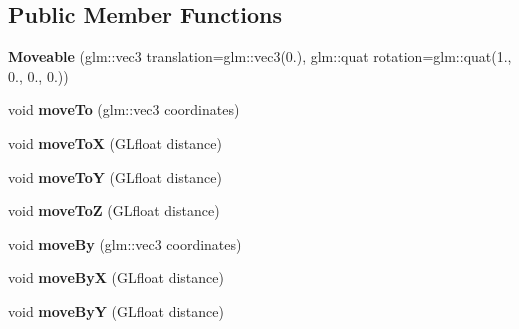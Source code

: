 \subsection*{Public Member Functions}
\begin{DoxyCompactItemize}
\item 
\hypertarget{classfillwave_1_1models_1_1Moveable_a3aeef08f9d141fb567013016bee92313}{}{\bfseries Moveable} (glm\+::vec3 translation=glm\+::vec3(0.), glm\+::quat rotation=glm\+::quat(1., 0., 0., 0.))\label{classfillwave_1_1models_1_1Moveable_a3aeef08f9d141fb567013016bee92313}

\item 
\hypertarget{classfillwave_1_1models_1_1Moveable_a9b6ebdac3c1a9b1bd6d1222c90218386}{}void {\bfseries move\+To} (glm\+::vec3 coordinates)\label{classfillwave_1_1models_1_1Moveable_a9b6ebdac3c1a9b1bd6d1222c90218386}

\item 
\hypertarget{classfillwave_1_1models_1_1Moveable_ac52df2a6d5bdde840392ceb11609712f}{}void {\bfseries move\+To\+X} (G\+Lfloat distance)\label{classfillwave_1_1models_1_1Moveable_ac52df2a6d5bdde840392ceb11609712f}

\item 
\hypertarget{classfillwave_1_1models_1_1Moveable_ab4b02f00aade91d7cdc50c87a52ecfbd}{}void {\bfseries move\+To\+Y} (G\+Lfloat distance)\label{classfillwave_1_1models_1_1Moveable_ab4b02f00aade91d7cdc50c87a52ecfbd}

\item 
\hypertarget{classfillwave_1_1models_1_1Moveable_aa110af1857faeae74073c8b281de59e7}{}void {\bfseries move\+To\+Z} (G\+Lfloat distance)\label{classfillwave_1_1models_1_1Moveable_aa110af1857faeae74073c8b281de59e7}

\item 
\hypertarget{classfillwave_1_1models_1_1Moveable_a66c1bf38ed64f94ea471f985c1508525}{}void {\bfseries move\+By} (glm\+::vec3 coordinates)\label{classfillwave_1_1models_1_1Moveable_a66c1bf38ed64f94ea471f985c1508525}

\item 
\hypertarget{classfillwave_1_1models_1_1Moveable_ad28fe42c676c103bc955e54baf48eded}{}void {\bfseries move\+By\+X} (G\+Lfloat distance)\label{classfillwave_1_1models_1_1Moveable_ad28fe42c676c103bc955e54baf48eded}

\item 
\hypertarget{classfillwave_1_1models_1_1Moveable_a42665ab604e2e9d85f7440d42c277956}{}void {\bfseries move\+By\+Y} (G\+Lfloat distance)\label{classfillwave_1_1models_1_1Moveable_a42665ab604e2e9d85f7440d42c277956}


\end{DoxyCompactItemize}
